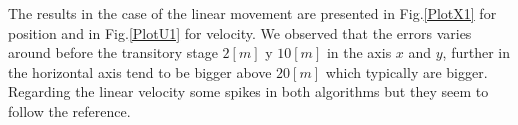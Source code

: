 \documentclass[10pt,conference]{IEEEtran}
\begin{document}
The results in the case of the linear movement are presented in Fig.\ref{PlotX1} for position and in Fig.\ref{PlotU1} for velocity. We observed that the errors varies around before the transitory stage $2[m]$ y $10[m]$ in the axis $x$ and $y$, further in the horizontal axis tend to be bigger above $20[m]$ which typically are bigger. Regarding the linear velocity some spikes in both algorithms but they seem to follow the reference.\par
\end{document}
